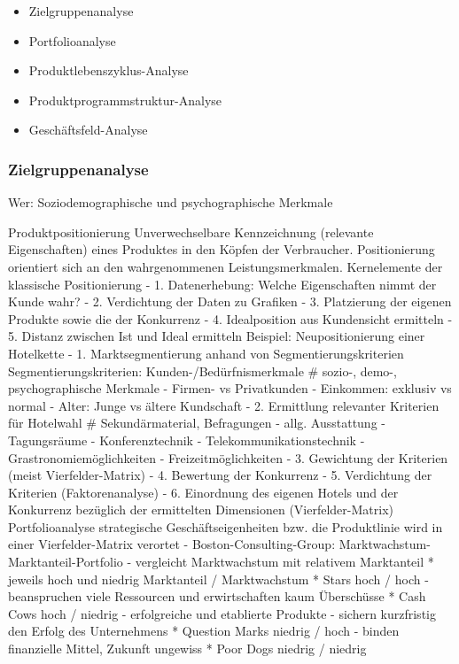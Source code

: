 \begin{itemize}
	\item Zielgruppenanalyse
	\item Portfolioanalyse
	\item Produktlebenszyklus-Analyse
	\item Produktprogrammstruktur-Analyse
	\item Geschäftsfeld-Analyse
\end{itemize}



\subsubsection{Zielgruppenanalyse}
Wer: Soziodemographische und psychographische Merkmale      

Produktpositionierung
	Unverwechselbare Kennzeichnung (relevante Eigenschaften) eines
	Produktes in den Köpfen der Verbraucher. Positionierung orientiert
	sich an den wahrgenommenen Leistungsmerkmalen.
 Kernelemente der klassische Positionierung
	- 1. Datenerhebung: Welche Eigenschaften nimmt der Kunde wahr?
	- 2. Verdichtung der Daten zu Grafiken
	- 3. Platzierung der eigenen Produkte sowie die der Konkurrenz
	- 4. Idealposition aus Kundensicht ermitteln
	- 5. Distanz zwischen Ist und Ideal ermitteln
 Beispiel: Neupositionierung einer Hotelkette
	- 1. Marktsegmentierung anhand von Segmentierungskriterien
		Segmentierungskriterien: Kunden-/Bedürfnismerkmale
		# sozio-, demo-, psychographische Merkmale
		- Firmen- vs Privatkunden
		- Einkommen: exklusiv vs normal
		- Alter: Junge vs ältere Kundschaft
	- 2. Ermittlung relevanter Kriterien für Hotelwahl
		# Sekundärmaterial, Befragungen
		- allg. Ausstattung
		- Tagungsräume
		- Konferenztechnik
		- Telekommunikationstechnik
		- Grastronomiemöglichkeiten
		- Freizeitmöglichkeiten
	- 3. Gewichtung der Kriterien (meist Vierfelder-Matrix)
	- 4. Bewertung der Konkurrenz
	- 5. Verdichtung der Kriterien (Faktorenanalyse)
	- 6. Einordnung des eigenen Hotels und der Konkurrenz bezüglich der
	 ermittelten Dimensionen (Vierfelder-Matrix)
Portfolioanalyse
	strategische Geschäftseigenheiten bzw. die Produktlinie wird in einer
	Vierfelder-Matrix verortet
	- Boston-Consulting-Group: Marktwachstum-Marktanteil-Portfolio
		- vergleicht Marktwachstum mit relativem Marktanteil
		* jeweils hoch und niedrig
					Marktanteil	/ Marktwachstum
			* Stars			hoch	/ hoch
			 - beanspruchen viele Ressourcen und erwirtschaften
			   kaum Überschüsse
			* Cash Cows		hoch	/ niedrig
			 - erfolgreiche und etablierte Produkte
			 - sichern kurzfristig den Erfolg des Unternehmens
			* Question Marks	niedrig	/ hoch
			 - binden finanzielle Mittel, Zukunft ungewiss
			* Poor Dogs		niedrig	/ niedrig

